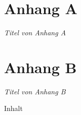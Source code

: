 \begin{appendices}
    \chapter*{Anhang A}
    \noindent \textit{Titel von Anhang A}
    



    \chapter*{Anhang B}
    \noindent \textit{Titel von Anhang B}

    Inhalt
\end{appendices}




